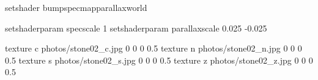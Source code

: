 setshader bumpspecmapparallaxworld

setshaderparam specscale 1
setshaderparam parallaxscale 0.025 -0.025

texture c photos/stone02_c.jpg 0 0 0 0.5
texture n photos/stone02_n.jpg 0 0 0 0.5
texture s photos/stone02_s.jpg 0 0 0 0.5
texture z photos/stone02_z.jpg 0 0 0 0.5
